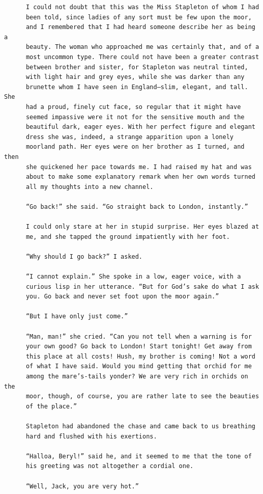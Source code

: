 \documentclass{article}
\begin{document}
\begin{verbatim}
      I could not doubt that this was the Miss Stapleton of whom I had
      been told, since ladies of any sort must be few upon the moor,
      and I remembered that I had heard someone describe her as being a
      beauty. The woman who approached me was certainly that, and of a
      most uncommon type. There could not have been a greater contrast
      between brother and sister, for Stapleton was neutral tinted,
      with light hair and grey eyes, while she was darker than any
      brunette whom I have seen in England—slim, elegant, and tall. She
      had a proud, finely cut face, so regular that it might have
      seemed impassive were it not for the sensitive mouth and the
      beautiful dark, eager eyes. With her perfect figure and elegant
      dress she was, indeed, a strange apparition upon a lonely
      moorland path. Her eyes were on her brother as I turned, and then
      she quickened her pace towards me. I had raised my hat and was
      about to make some explanatory remark when her own words turned
      all my thoughts into a new channel.

      “Go back!” she said. “Go straight back to London, instantly.”

      I could only stare at her in stupid surprise. Her eyes blazed at
      me, and she tapped the ground impatiently with her foot.

      “Why should I go back?” I asked.

      “I cannot explain.” She spoke in a low, eager voice, with a
      curious lisp in her utterance. “But for God’s sake do what I ask
      you. Go back and never set foot upon the moor again.”

      “But I have only just come.”

      “Man, man!” she cried. “Can you not tell when a warning is for
      your own good? Go back to London! Start tonight! Get away from
      this place at all costs! Hush, my brother is coming! Not a word
      of what I have said. Would you mind getting that orchid for me
      among the mare’s-tails yonder? We are very rich in orchids on the
      moor, though, of course, you are rather late to see the beauties
      of the place.”

      Stapleton had abandoned the chase and came back to us breathing
      hard and flushed with his exertions.

      “Halloa, Beryl!” said he, and it seemed to me that the tone of
      his greeting was not altogether a cordial one.

      “Well, Jack, you are very hot.”


\end{verbatim}
\end{document}
